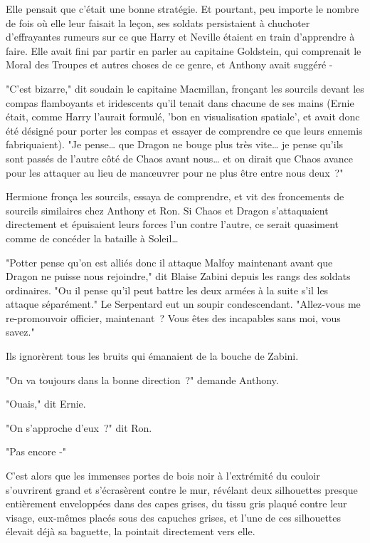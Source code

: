 Elle pensait que c'était une bonne stratégie. Et pourtant, peu importe le nombre de fois où elle leur faisait la leçon, ses soldats persistaient à chuchoter d'effrayantes rumeurs sur ce que Harry et Neville étaient en train d'apprendre à faire. Elle avait fini par partir en parler au capitaine Goldstein, qui comprenait le Moral des Troupes et autres choses de ce genre, et Anthony avait suggéré -

"C'est bizarre," dit soudain le capitaine Macmillan, fronçant les sourcils devant les compas flamboyants et iridescents qu'il tenait dans chacune de ses mains (Ernie était, comme Harry l'aurait formulé, 'bon en visualisation spatiale', et avait donc été désigné pour porter les compas et essayer de comprendre ce que leurs ennemis fabriquaient). "Je pense… que Dragon ne bouge plus très vite… je pense qu'ils sont passés de l'autre côté de Chaos avant nous… et on dirait que Chaos avance pour les attaquer au lieu de manœuvrer pour ne plus être entre nous deux~?"

Hermione fronça les sourcils, essaya de comprendre, et vit des froncements de sourcils similaires chez Anthony et Ron. Si Chaos et Dragon s'attaquaient directement et épuisaient leurs forces l'un contre l'autre, ce serait quasiment comme de concéder la bataille à Soleil…

"Potter pense qu'on est alliés donc il attaque Malfoy maintenant avant que Dragon ne puisse nous rejoindre," dit Blaise Zabini depuis les rangs des soldats ordinaires. "Ou il pense qu'il peut battre les deux armées à la suite s'il les attaque séparément." Le Serpentard eut un soupir condescendant. "Allez-vous me re-promouvoir officier, maintenant~? Vous êtes des incapables sans moi, vous savez."

Ils ignorèrent tous les bruits qui émanaient de la bouche de Zabini.

"On va toujours dans la bonne direction~?" demande Anthony.

"Ouais," dit Ernie.

"On s'approche d'eux~?" dit Ron.

"Pas encore -"

C'est alors que les immenses portes de bois noir à l'extrémité du couloir s'ouvrirent grand et s'écrasèrent contre le mur, révélant deux silhouettes presque entièrement enveloppées dans des capes grises, du tissu gris plaqué contre leur visage, eux-mêmes placés sous des capuches grises, et l'une de ces silhouettes élevait déjà sa baguette, la pointait directement vers elle.

